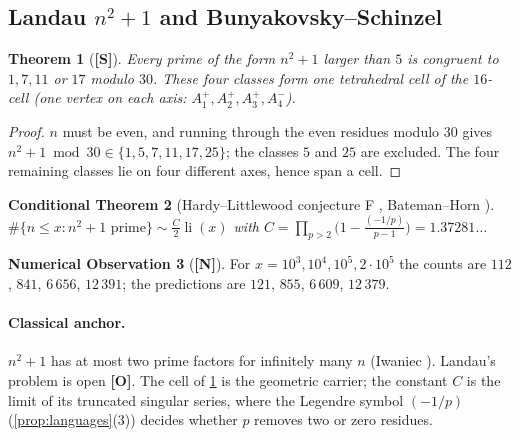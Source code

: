 \documentclass[11pt,a4paper]{article}
\newcommand{\statS}{\textsf{\textbf{[S]}}}
\newcommand{\statN}{\textsf{\textbf{[N]}}}
\newcommand{\statO}{\textsf{\textbf{[O]}}}
\theoremstyle{plain}
\newtheorem{theorem}{Theorem}[section]
\newtheorem{conditional}[theorem]{Conditional Theorem}
\theoremstyle{definition}
\newtheorem{observation}[theorem]{Numerical Observation}
\theoremstyle{remark}
\newcommand{\li}{\operatorname{li}}
\begin{document}
\subsection{Landau \texorpdfstring{$n^2+1$}{n2+1} and Bunyakovsky--Schinzel}
\begin{theorem}[\statS]\label{thm:landau}
Every prime of the form $n^2+1$ larger than $5$ is congruent to $1,7,11$ or
$17$ modulo $30$. These four classes form one tetrahedral cell of the $16$-cell
(one vertex on each axis: $A_1^+,A_2^+,A_3^+,A_4^-$).
\end{theorem}
\begin{proof}
$n$ must be even, and running through the even residues modulo $30$ gives
$n^2+1\bmod30\in\{1,5,7,11,17,25\}$; the classes $5$ and $25$ are excluded.
The four remaining classes lie on four different axes, hence span a cell.
\end{proof}
\begin{conditional}[Hardy--Littlewood conjecture F \cite{HL}, Bateman--Horn \cite{BatemanHorn}]
$\#\{n\le x:n^2+1\text{ prime}\}\sim\frac C2\li(x)$ with
$C=\prod_{p>2}\bigl(1-\frac{(-1/p)}{p-1}\bigr)=1.37281\ldots$
\end{conditional}
\begin{observation}[\statN]
For $x=10^3,10^4,10^5,2\cdot10^5$ the counts are $112$, $841$, $6\,656$,
$12\,391$; the predictions are $121$, $855$, $6\,609$, $12\,379$.
\end{observation}
\paragraph{Classical anchor.} $n^2+1$ has at most two prime factors for
infinitely many $n$ (Iwaniec \cite{Iwaniec}). Landau's problem is open \statO.
The cell of \cref{thm:landau} is the geometric carrier; the constant $C$ is
the limit of its truncated singular series, where the Legendre symbol $(-1/p)$
(\cref{prop:languages}(3)) decides whether $p$ removes two or zero residues.
\end{document}
